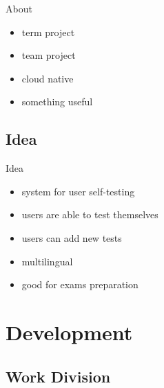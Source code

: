 \documentclass[]{beamer}
\begin{document}
    \begin{frame}{About}
      \begin{itemize}
        \item term project
        \item team project
        \item cloud native
        \item something useful
      \end{itemize}
    \end{frame}

  \subsection{Idea}

    \begin{frame}{Idea}
      \begin{itemize}
        \item system for user self-testing
        \item users are able to test themselves
        \item users can add new tests
        \item multilingual
        \item good for exams preparation
      \end{itemize}
    \end{frame}

\section[Development]{Development}

  \subsection{Work Division}
\end{document}
